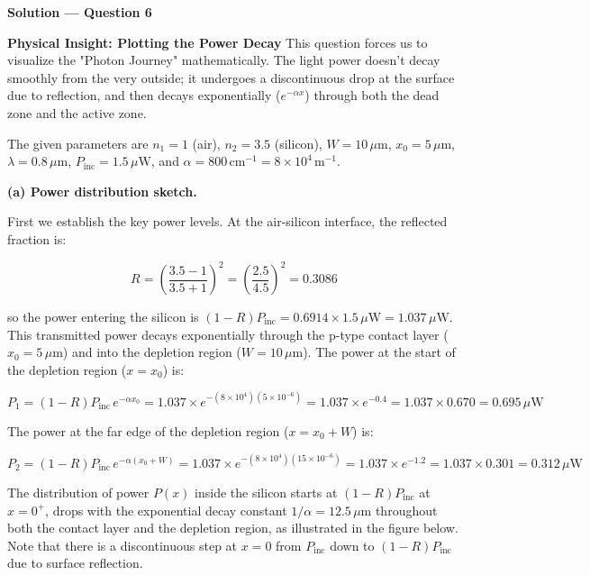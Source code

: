 \textbf{\large Solution --- Question 6}

\textbf{Physical Insight: Plotting the Power Decay}
This question forces us to visualize the "Photon Journey" mathematically. The light power doesn't decay smoothly from the very outside; it undergoes a discontinuous drop at the surface due to reflection, and then decays exponentially ($e^{-\alpha x}$) through both the dead zone and the active zone.

The given parameters are $n_1 = 1$ (air), $n_2 = 3.5$ (silicon), $W = 10\,\mu\text{m}$, $x_0 = 5\,\mu\text{m}$, $\lambda = 0.8\,\mu\text{m}$, $P_{\text{inc}} = 1.5\,\mu\text{W}$, and $\alpha = 800\,\text{cm}^{-1} = 8\times10^4\,\text{m}^{-1}$.

\textbf{(a) Power distribution sketch.}

First we establish the key power levels. At the air-silicon interface, the reflected fraction is:

\begin{equation*}
  R = \left(\frac{3.5 - 1}{3.5 + 1}\right)^2 = \left(\frac{2.5}{4.5}\right)^2 = 0.3086
\end{equation*}

so the power entering the silicon is $(1-R)P_{\text{inc}} = 0.6914\times1.5\,\mu\text{W} = 1.037\,\mu\text{W}$. This transmitted power decays exponentially through the p-type contact layer ($x_0 = 5\,\mu\text{m}$) and into the depletion region ($W = 10\,\mu\text{m}$). The power at the start of the depletion region ($x = x_0$) is:

\begin{equation*}
  P_1 = (1-R)P_{\text{inc}}\,e^{-\alpha x_0} = 1.037 \times e^{-(8\times10^4)(5\times10^{-6})} = 1.037\times e^{-0.4} = 1.037\times0.670 = 0.695\,\mu\text{W}
\end{equation*}

The power at the far edge of the depletion region ($x = x_0 + W$) is:

\begin{equation*}
  P_2 = (1-R)P_{\text{inc}}\,e^{-\alpha(x_0+W)} = 1.037\times e^{-(8\times10^4)(15\times10^{-6})} = 1.037\times e^{-1.2} = 1.037\times0.301 = 0.312\,\mu\text{W}
\end{equation*}

The distribution of power $P(x)$ inside the silicon starts at $(1-R)P_{\text{inc}}$ at $x=0^+$, drops with the exponential decay constant $1/\alpha = 12.5\,\mu\text{m}$ throughout both the contact layer and the depletion region, as illustrated in the figure below. Note that there is a discontinuous step at $x=0$ from $P_{\text{inc}}$ down to $(1-R)P_{\text{inc}}$ due to surface reflection.

